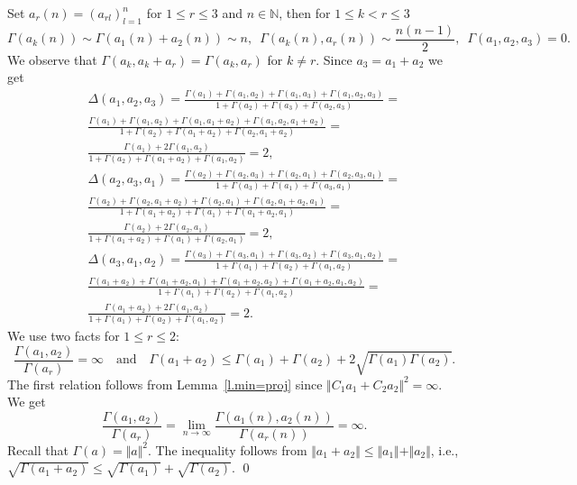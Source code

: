 \documentclass[preprint,12pt]{elsarticle}
\numberwithin{equation}{section}
\begin{document}
\begin{pf}
Set $a_r(n)=(a_{rl})_{l=1}^n$ for $1\leq r\leq 3$ and $n\in \mathbb N$,  then for $1\leq k<r\leq 3$
$$
\Gamma(a_k(n))\!\sim\! \Gamma(a_1(n)+a_2(n))\!\sim\! n,\,\,\, \Gamma(a_k(n),a_r(n))\!\sim\! \frac{n(n-1)}{2},\,\,\,\Gamma(a_1,a_2,a_3)\!=\!0.
$$
We observe that $\Gamma(a_k,a_k+a_r)=\Gamma(a_k,a_r)$ for $k\not=r$.   Since $a_3=a_1+a_2$ we get
%
\begin{eqnarray*}
&& \Delta(a_1,a_2,a_3)=\frac{\Gamma(a_1)+\Gamma(a_1,a_2)+\Gamma(a_1,a_3)+\Gamma(a_1,a_2,a_3)}{1+\Gamma(a_2)+\Gamma(a_3)+\Gamma(a_2,a_3)}=\\
&&\frac{\Gamma(a_1)+\Gamma(a_1,a_2)+\Gamma(a_1,a_1+a_2)+\Gamma(a_1,a_2,a_1+a_2)}{1+\Gamma(a_2)+\Gamma(a_1+a_2)+\Gamma(a_2,a_1+a_2)}
=\\
&&\frac{\Gamma(a_1)+2\Gamma(a_1,a_2)}{1+\Gamma(a_2)+\Gamma(a_1+a_2)+\Gamma(a_1,a_2)}=2,\\
%
&&\Delta(a_2,a_3,a_1)=\frac{\Gamma(a_2)+\Gamma(a_2,a_3)+\Gamma(a_2,a_1)+\Gamma(a_2,a_3,a_1)}{1+\Gamma(a_3)+\Gamma(a_1)+\Gamma(a_3,a_1)}=\\
&&\frac{\Gamma(a_2)+\Gamma(a_2,a_1+a_2)+\Gamma(a_2,a_1)+\Gamma(a_2,a_1+a_2,a_1)}{1+\Gamma(a_1+a_2)+\Gamma(a_1)+\Gamma(a_1+a_2,a_1)}
=\\
&&\frac{\Gamma(a_2)+2\Gamma(a_2,a_1)}{1+\Gamma(a_1+a_2)+\Gamma(a_1)+\Gamma(a_2,a_1)}=2,
\end{eqnarray*}
\begin{eqnarray*}
&&\Delta(a_3,a_1,a_2)=\frac{\Gamma(a_3)+\Gamma(a_3,a_1)+\Gamma(a_3,a_2)+\Gamma(a_3,a_1,a_2)}{1+\Gamma(a_1)+\Gamma(a_2)+\Gamma(a_1,a_2)}=\\
&&\frac{\Gamma(a_1+a_2)+\Gamma(a_1+a_2,a_1)+\Gamma(a_1+a_2,a_2)+\Gamma(a_1+a_2,a_1,a_2)}{1+\Gamma(a_1)+\Gamma(a_2)+\Gamma(a_1,a_2)}
=\\
&&\frac{\Gamma(a_1+a_2)+2\Gamma(a_1,a_2)}{1+\Gamma(a_1)+\Gamma(a_2)+\Gamma(a_1,a_2)}=2.
\end{eqnarray*}
We use two facts for $1\leq r\leq 2$:
$$
\frac{\Gamma(a_1,a_2)}{\Gamma(a_r)}=\infty\quad\text{and}\quad \Gamma(a_1+a_2)\leq \Gamma(a_1)+\Gamma(a_2)+2\sqrt{\Gamma(a_1)\Gamma(a_2)}.
$$
The first relation follows from Lemma~\ref{l.min=proj} since 
$\Vert C_1a_1 +C_2a_2\Vert^2=\infty$. We get 
 $$\frac{\Gamma(a_1,a_2)}{\Gamma(a_r)}=\lim_{n\to\infty} \frac{\Gamma(a_1(n),a_2(n))}{\Gamma(a_r(n))}=\infty.$$
Recall that $\Gamma(a)=\Vert a\Vert^2$.  
The inequality follows from  $\Vert a_1+a_2\Vert\leq \Vert a_1\Vert+\Vert a_2\Vert$, i.e.,
$\sqrt{\Gamma(a_1+a_2)}\leq \sqrt{\Gamma(a_1)}+\sqrt{\Gamma(a_2)}$. 
\qed\end{pf}
\end{document}

